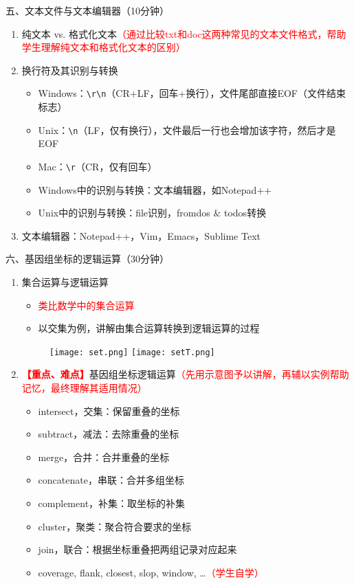 \documentclass{TIJMUjiaoanLL}
\begin{document}
\vspace*{0.2cm}
\noindent
五、文本文件与文本编辑器（10分钟）
\begin{enumerate}
  \item 纯文本 vs. 格式化文本\textcolor{red}{（通过比较txt和doc这两种常见的文本文件格式，帮助学生理解纯文本和格式化文本的区别）}
  \item 换行符及其识别与转换
    \begin{itemize}
      \item Windows：\verb|\r\n|（CR+LF，回车+换行），文件尾部直接EOF（文件结束标志）
      \item Unix：\verb|\n|（LF，仅有换行），文件最后一行也会增加该字符，然后才是EOF
      \item Mac：\verb|\r|（CR，仅有回车）
      \item Windows中的识别与转换：文本编辑器，如Notepad++
      \item Unix中的识别与转换：file识别，fromdos \& todos转换
    \end{itemize}
  \item 文本编辑器：Notepad++，Vim，Emacs，Sublime Text
\end{enumerate}


\otherTail
\newpage
\otherHeader


\noindent
六、基因组坐标的逻辑运算（30分钟）
\begin{enumerate}
  \item 集合运算与逻辑运算
    \begin{itemize}
      \item \textcolor{red}{类比数学中的集合运算}
      \item 以交集为例，讲解由集合运算转换到逻辑运算的过程
    \end{itemize}
    \begin{figure}[h]
      \centering
      \texttt{[image: set.png]}
      \hspace*{1cm}
      \texttt{[image: setT.png]}
    \end{figure}
  \item \textcolor{red}{\textbf{【重点、难点】}}基因组坐标逻辑运算\textcolor{red}{（先用示意图予以讲解，再辅以实例帮助记忆，最终理解其适用情况）}
    \begin{itemize}
      \item intersect，交集：保留重叠的坐标
      \item subtract，减法：去除重叠的坐标
      \item merge，合并：合并重叠的坐标
      \item concatenate，串联：合并多组坐标
      \item complement，补集：取坐标的补集
      \item cluster，聚类：聚合符合要求的坐标
      \item join，联合：根据坐标重叠把两组记录对应起来
      \item coverage, flank, closest, slop, window, \ldots \textcolor{red}{（学生自学）}
    \end{itemize}
\end{enumerate}
\end{document}

